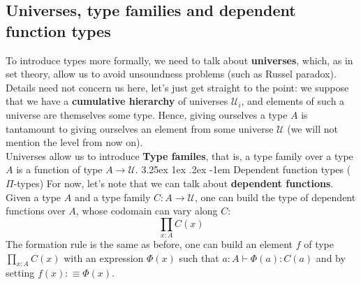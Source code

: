 \documentclass{report}
\makeatletter
\renewcommand\paragraph{\@startsection{paragraph}{5}{\z@}%
  {3.25ex \@plus1ex \@minus.2ex}%
  {-1em}%
  {\normalfont\normalsize\bfseries}}
\makeatother
\begin{document}
\subsection{Universes, type families and dependent function types}
To introduce types more formally, we need to talk about \textbf{universes}, which, as in set theory, allow us to avoid unsoundness problems (such as Russel paradox). Details need not concern us here, let's just get straight to the point: we suppose that we have a \textbf{cumulative hierarchy} of universes $\mathcal{U}_i$, and elements of such a universe are themselves some type. Hence, giving ourselves a type $A$ is tantamount to giving ourselves an element from some universe $\mathcal{U}$ (we will not mention the level from now on).\\
 Universes allow us to introduce \textbf{Type familes}, that is, a type family over a type $A$ is a function of type $A \to \mathcal{U}$.
 \paragraph{Dependent function types ($\Pi$-types)}
 For now, let's note that we can talk about \textbf{dependent functions}. Given a type $A$ and a type family $C: A \rightarrow \mathcal{U}$, one can build the type of dependent functions over $A$, whose codomain can vary along $C$: 
$$\prod_{x : A} C(x)$$
The formation rule is the same as before, one can build an element $f$ of type $\prod_{x : A} C(x)$ with an expression $\Phi(x)$ such that $a : A \vdash \Phi(a) : C(a)$ and by setting $f(x) :\equiv \Phi(x)$.
\end{document}
